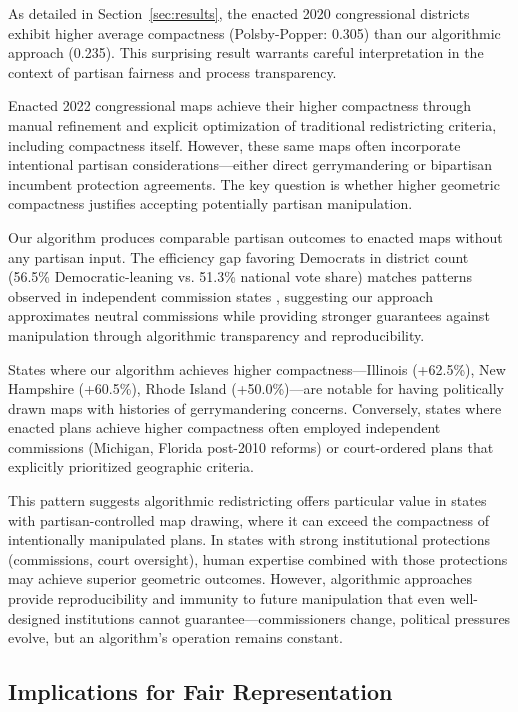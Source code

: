 As detailed in Section~\ref{sec:results}, the enacted 2020 congressional districts exhibit higher average compactness (Polsby-Popper: 0.305) than our algorithmic approach (0.235). This surprising result warrants careful interpretation in the context of partisan fairness and process transparency.

Enacted 2022 congressional maps achieve their higher compactness through manual refinement and explicit optimization of traditional redistricting criteria, including compactness itself. However, these same maps often incorporate intentional partisan considerations—either direct gerrymandering or bipartisan incumbent protection agreements. The key question is whether higher geometric compactness justifies accepting potentially partisan manipulation.

Our algorithm produces comparable partisan outcomes to enacted maps without any partisan input. The efficiency gap favoring Democrats in district count (56.5\% Democratic-leaning vs. 51.3\% national vote share) matches patterns observed in independent commission states \cite{chen2013unintentional}, suggesting our approach approximates neutral commissions while providing stronger guarantees against manipulation through algorithmic transparency and reproducibility.

States where our algorithm achieves higher compactness—Illinois (+62.5\%), New Hampshire (+60.5\%), Rhode Island (+50.0\%)—are notable for having politically drawn maps with histories of gerrymandering concerns. Conversely, states where enacted plans achieve higher compactness often employed independent commissions (Michigan, Florida post-2010 reforms) or court-ordered plans that explicitly prioritized geographic criteria.

This pattern suggests algorithmic redistricting offers particular value in states with partisan-controlled map drawing, where it can exceed the compactness of intentionally manipulated plans. In states with strong institutional protections (commissions, court oversight), human expertise combined with those protections may achieve superior geometric outcomes. However, algorithmic approaches provide reproducibility and immunity to future manipulation that even well-designed institutions cannot guarantee—commissioners change, political pressures evolve, but an algorithm's operation remains constant.
\subsection{Implications for Fair Representation}

